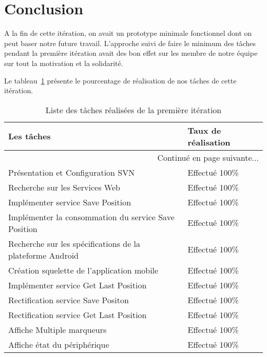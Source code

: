 

\section*{Conclusion}

A la fin de cette itération, on avait un prototype minimale fonctionnel
dont on peut baser notre future travail.
L'approche suivi de faire le minimum des tâches pendant la première itération
avait des bon effet sur les membre de notre équipe sur tout la motivation et
la solidarité.

Le tableau~\ref{tab:sprint1-evaluation} présente le pourcentage de
réalisation de nos tâches de cette itération.

\begin{center}
    \begin{longtable}{| l | l |}
        \caption{Liste des tâches réalisées de la première itération}
\label{tab:sprint1-evaluation} \\

        \hline
        \textbf{Les tâches} & \textbf{Taux de réalisation} \\ \hline
        \endhead

        \hline \multicolumn{2}{|r|}{{Continué en page suivante$\dotsc$}} \\ \hline
        \endfoot

        \hline \hline
        \endlastfoot

        \hline
Présentation et Configuration SVN & Effectué 100\% \\ \hline
Recherche sur les Services Web & Effectué 100\% \\ \hline
Implémenter service Save Position & Effectué 100\% \\ \hline
Implémenter la consommation du service Save Position & Effectué 100\% \\ \hline
Recherche sur les spécifications de la plateforme Android & Effectué 100\% \\ \hline
Création squelette de l'application mobile & Effectué 100\% \\ \hline
Implémenter service Get Last Position & Effectué 100\% \\ \hline
Rectification service Save Positon & Effectué 100\% \\ \hline
Rectification service Get Last Position & Effectué 100\% \\ \hline
Affiche Multiple marqueurs & Effectué 100\% \\ \hline
Affiche état du périphérique & Effectué 100\% \\ \hline
    \end{longtable}
\end{center}
